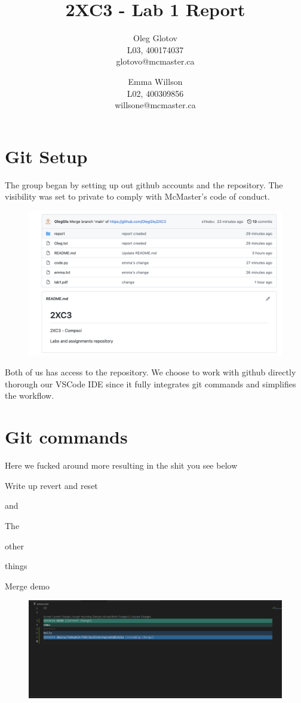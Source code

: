 \documentclass[twocolumn, 10pt]{article}
\title{2XC3 - Lab 1 Report}
\author{Oleg Glotov\\ L03, 400174037\\ glotovo@mcmaster.ca \and Emma Willson\\ L02, 400309856\\ willsone@mcmaster.ca}
\begin{document}
\maketitle
\section{Git Setup}\label{sec:git}
The group began by setting up out github accounts and the repository. The visibility was set to private to comply with McMaster's code of conduct.

\begin{figure}[H]
\includegraphics[width=\linewidth]{img1}
\end{figure}

Both of us has access to the repository. We choose to work with github directly thorough our VSCode IDE since it fully integrates git commands and simplifies the workflow.

\section{Git commands}

Here we fucked around more resulting in the shit you see below

Write up revert and reset

and

The

other 

things

Merge demo

\begin{figure}[H]
\includegraphics[width=\linewidth]{merge}
\end{figure}
\end{document}
